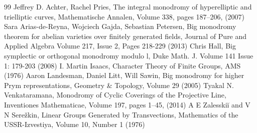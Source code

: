 \documentclass{article}
\theoremstyle{definition}
\begin{document}
	\begin{thebibliography}{99}
	 Jeffrey D. Achter, Rachel Pries, The integral monodromy of hyperelliptic and trielliptic curves, Mathematische Annalen, Volume 338, pages 187–206, (2007)
	 Sara Arias-de-Reyna, Wojciech Gajda, Sebastian Petersen, Big monodromy theorem for abelian varieties over finitely generated fields, Journal of Pure and Applied Algebra
	Volume 217, Issue 2, Pages 218-229 (2013)
	 Chris Hall, Big symplectic or orthogonal monodromy modulo l, Duke Math. J. Volume 141 Issue 1: 179-203 (2008)
	 I. Martin Isaacs, Character Theory of Finite Groups, AMS (1976)
	 Aaron Landesman, Daniel Litt, Will Sawin, Big monodromy for higher Prym representations, Geometry \& Topology, Volume 29 (2005)
	 Tyakal N. Venkataramana, Monodromy of Cyclic Coverings of the Projective Line, Inventiones Mathematicae, Volume 197, pages 1–45, (2014)
	 A E Zalesskiĭ and V N Serežkin, Linear Groups Generated by Transvections, Mathematics of the USSR-Izvestiya, Volume 10, Number 1 (1976)
\end{thebibliography}
\end{document}
